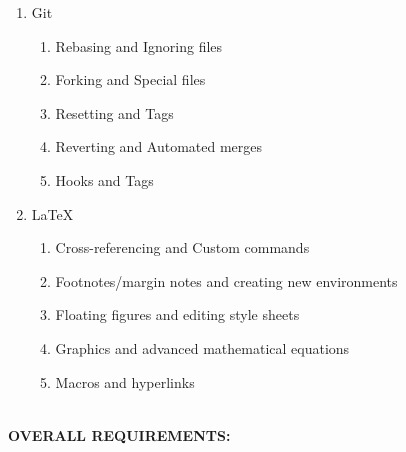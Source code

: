 \documentclass[a4paper, 11pt]{report}
\begin{document}
{{\begin{enumerate}
\item{Git}
	\begin{enumerate}
	\item Rebasing and Ignoring files 
	\item Forking and Special files 
	\item Resetting and Tags 
	\item Reverting and Automated merges 
	\item Hooks and Tags 
	\end{enumerate}
\item LaTeX 
	\begin{enumerate}
	\item Cross-referencing and Custom commands 
	\item Footnotes/margin notes and creating new environments 
	\item Floating figures and editing style sheets 
	\item Graphics and advanced mathematical equations 
	\item Macros and hyperlinks
	\end{enumerate}
\end{enumerate}
~\\[2mm]

\textbf{OVERALL REQUIREMENTS:}

}}
\end{document}
